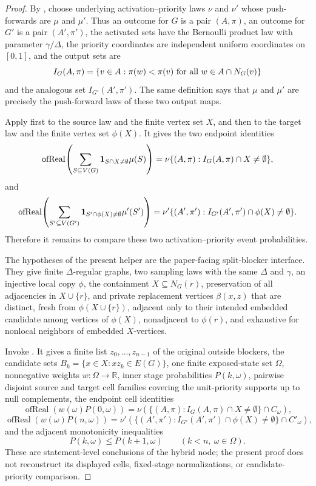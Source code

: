 \begin{proof}
By , choose underlying
activation--priority laws \(\nu\) and \(\nu'\) whose push-forwards are
\(\mu\) and \(\mu'\).  Thus an outcome for \(G\) is a pair
\((A,\pi)\), an outcome for \(G'\) is a pair \((A',\pi')\), the activated
sets have the Bernoulli product law with parameter \(\gamma/\Delta\), the
priority coordinates are independent uniform coordinates on \([0,1]\), and
the output sets are
\[
I_G(A,\pi)=\{v\in A:\pi(w)<\pi(v)\hbox{ for all }w\in A\cap N_G(v)\}
\]
and the analogous set \(I_{G'}(A',\pi')\).  The same definition says that
\(\mu\) and \(\mu'\) are precisely the push-forward laws of these two output
maps.

Apply  first to the source law and
the finite vertex set \(X\), and then to the target law and the finite vertex
set \(\phi(X)\).  It gives the two endpoint identities
\[
\operatorname{ofReal}\!\left(\sum_{S\subseteq V(G)}
{\bf 1}_{S\cap X\ne\emptyset}\mu(S)\right)
=
\nu\{(A,\pi):I_G(A,\pi)\cap X\ne\emptyset\},
\]
and
\[
\operatorname{ofReal}\!\left(\sum_{S'\subseteq V(G')}
{\bf 1}_{S'\cap\phi(X)\ne\emptyset}\mu'(S')\right)
=
\nu'\{(A',\pi'):I_{G'}(A',\pi')\cap\phi(X)\ne\emptyset\}.
\]
Therefore it remains to compare these two activation--priority event
probabilities.

The hypotheses of the present helper are the paper-facing split-blocker
interface.  They give finite \(\Delta\)-regular graphs, two sampling laws with
the same \(\Delta\) and \(\gamma\), an injective local copy \(\phi\), the
containment \(X\subseteq N_G(r)\), preservation of all adjacencies in
\(X\cup\{r\}\), and private replacement vertices \(\beta(x,z)\) that are
distinct, fresh from \(\phi(X\cup\{r\})\), adjacent only to their intended
embedded candidate among vertices of \(\phi(X)\), nonadjacent to \(\phi(r)\),
and exhaustive for nonlocal neighbors of embedded \(X\)-vertices.

Invoke .  It gives a finite list
\(z_0,\ldots,z_{n-1}\) of the original outside blockers, the candidate sets
\(B_k=\{x\in X:xz_k\in E(G)\}\), one finite exposed-state set \(\Omega\),
nonnegative weights \(w:\Omega\to\mathbb R\), inner stage probabilities
\(P(k,\omega)\), pairwise disjoint source and target cell families covering
the unit-priority supports up to null complements, the endpoint cell
identities
\[
\operatorname{ofReal}(w(\omega)P(0,\omega))
=
\nu(\{(A,\pi):I_G(A,\pi)\cap X\ne\emptyset\}\cap C_\omega),
\]
\[
\operatorname{ofReal}(w(\omega)P(n,\omega))
=
\nu'(\{(A',\pi'):I_{G'}(A',\pi')\cap\phi(X)\ne\emptyset\}\cap C'_\omega),
\]
and the adjacent monotonicity inequalities
\[
P(k,\omega)\le P(k+1,\omega)\qquad(k<n,\ \omega\in\Omega).
\]
These are statement-level conclusions of the hybrid node; the present proof
does not reconstruct its displayed cells, fixed-stage normalizations, or
candidate-priority comparison.


\end{proof}
